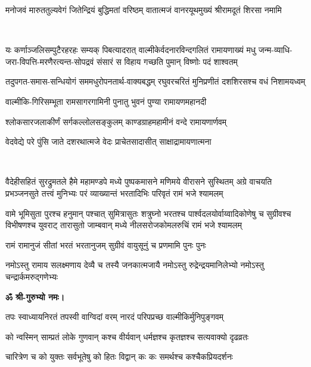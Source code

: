 \twolineshloka
{मनोजवं मारुततुल्यवेगं जितेन्द्रियं बुद्धिमतां वरिष्ठम्}
{वातात्मजं वानरयूथमुख्यं श्रीरामदूतं शिरसा नमामि}

\mbox{}\\
\resetShloka
{}

\fourlineindentedshloka
{यः कर्णाञ्जलिसम्पुटैरहरहः सम्यक् पिबत्यादरात्}
{वाल्मीकेर्वदनारविन्दगलितं रामायणाख्यं मधु}
{जन्म-व्याधि-जरा-विपत्ति-मरणैरत्यन्त-सोपद्रवं}
{संसारं स विहाय गच्छति पुमान् विष्णोः पदं शाश्वतम्}

\twolineshloka
{तदुपगत-समास-सन्धियोगं सममधुरोपनतार्थ-वाक्यबद्धम्}
{रघुवरचरितं मुनिप्रणीतं दशशिरसश्च वधं निशामयध्वम्}

\twolineshloka
{वाल्मीकि-गिरिसम्भूता रामसागरगामिनी}
{पुनातु भुवनं पुण्या रामायणमहानदी}

\twolineshloka
{श्लोकसारजलाकीर्णं सर्गकल्लोलसङ्कुलम्}
{काण्डग्राहमहामीनं वन्दे रामायणार्णवम्}

\twolineshloka
{वेदवेद्ये परे पुंसि जाते दशरथात्मजे}
{वेदः प्राचेतसादासीत् साक्षाद्रामायणात्मना}

\mbox{}\\
\resetShloka
{}

\fourlineindentedshloka
{वैदेहीसहितं सुरद्रुमतले हैमे महामण्डपे}
{मध्ये पुष्पकमासने मणिमये वीरासने सुस्थितम्}
{अग्रे वाचयति प्रभञ्जनसुते तत्त्वं मुनिभ्यः परं}
{व्याख्यान्तं भरतादिभिः परिवृतं रामं भजे श्यामलम्}

\fourlineindentedshloka
{वामे भूमिसुता पुरश्च हनुमान् पश्चात् सुमित्रासुतः}
{शत्रुघ्नो भरतश्च पार्श्वदलयोर्वाय्वादिकोणेषु च}
{सुग्रीवश्च विभीषणश्च युवराट् तारासुतो जाम्बवान्}
{मध्ये नीलसरोजकोमलरुचिं रामं भजे श्यामलम्}

\twolineshloka
{रामं रामानुजं सीतां भरतं भरतानुजम्}
{सुग्रीवं वायुसूनुं च प्रणमामि पुनः पुनः}

\twolineshloka
{नमोऽस्तु रामाय सलक्ष्मणाय देव्यै च तस्यै जनकात्मजायै}
{नमोऽस्तु रुद्रेन्द्रयमानिलेभ्यो नमोऽस्तु चन्द्रार्कमरुद्गणेभ्यः}

\centerline{\textbf{ॐ श्री-गुरुभ्यो नमः।}}


\clearpage
\resetShloka
{}

\twolineshloka
{तपः स्वाध्यायनिरतं तपस्वी वाग्विदां वरम्}
{नारदं परिपप्रच्छ वाल्मीकिर्मुनिपुङ्गवम्}%

\twolineshloka
{को न्वस्मिन् साम्प्रतं लोके गुणवान् कश्च वीर्यवान्}
{धर्मज्ञश्च कृतज्ञश्च सत्यवाक्यो दृढव्रतः}%

\twolineshloka
{चारित्रेण च को युक्तः सर्वभूतेषु को हितः}
{विद्वान् कः कः समर्थश्च कश्चैकप्रियदर्शनः}%

